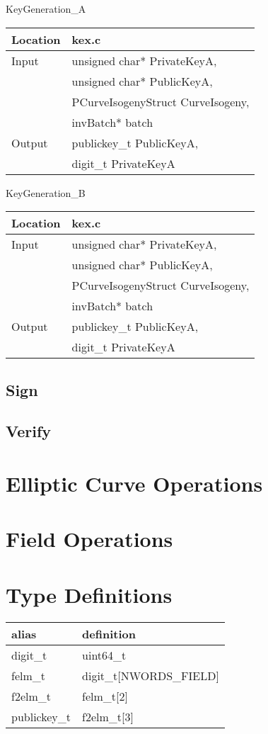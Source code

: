 \documentclass[10pt]{article}
\begin{document}
\parbox{.45\linewidth}{
\centering
KeyGeneration\_A
\begin{tabular}{@{}ll@{}}
	\toprule
	Location & kex.c \\
	\midrule
	Input & unsigned char* PrivateKeyA,\\
	& unsigned char* PublicKeyA,\\
	& PCurveIsogenyStruct CurveIsogeny,\\
	& invBatch* batch\\
	\midrule
	Output & publickey\_t PublicKeyA,\\
	& digit\_t PrivateKeyA\\
	\bottomrule
\end{tabular}}
\hfill
\parbox{.45\linewidth}{
\centering
KeyGeneration\_B
\begin{tabular}{@{}ll@{}}
	\toprule
	Location & kex.c \\
	\midrule
	Input & unsigned char* PrivateKeyA,\\
	& unsigned char* PublicKeyA,\\
	& PCurveIsogenyStruct CurveIsogeny,\\
	& invBatch* batch\\
	\midrule
	Output & publickey\_t PublicKeyA,\\
	& digit\_t PrivateKeyA\\
	\bottomrule
\end{tabular}}

\subsection{Sign}

\subsection{Verify}

\section{Elliptic Curve Operations}

\section{Field Operations}

\section{Type Definitions}

\begin{center}
\begin{tabular}{@{}ll@{}}
	\toprule
	alias & definition \\
	\midrule
	digit\_t & uint64\_t\\
	felm\_t & digit\_t[NWORDS\_FIELD]\\
	f2elm\_t & felm\_t[2]\\
	publickey\_t & f2elm\_t[3]\\
	\bottomrule
\end{tabular}
\end{center}
\end{document}
